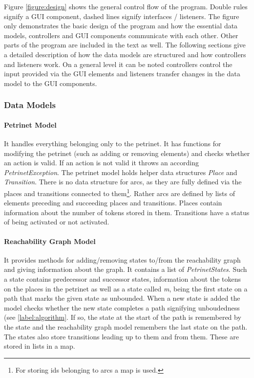\documentclass[10pt, a4paper]{article}
\begin{document}
Figure \ref{figure:design} shows the general control flow of the program. Double rules signify a GUI component, dashed lines signify interfaces / listeners. The figure only demonstrates the basic design of the program and how the essential data models, controllers and GUI components communicate with each other. Other parts of the program are included in the text as well. The following sections give a detailed description of how the data models are structured and how controllers and listeners work. On a general level it can be noted controllers control the input provided via the GUI elements and listeners transfer changes in the data model to the GUI components. 




\subsubsection{Data Models}

\paragraph{Petrinet Model} It handles everything belonging only to the petrinet. It has functions for modifying the petrinet (such as adding or removing elements) and checks whether an action is valid. If an action is not valid it throws an according \textit{PetrinetException}. The petrinet model holds helper data structures \textit{Place} and \textit{Transition}. There is no data structure for arcs, as they are fully defined via the places and transitions connected to them\footnote{For storing ids belonging to arcs a map is used.}. Rather arcs are defined by lists of elements preceding and succeeding places and transitions. Places contain information about the number of tokens stored in them. Transitions have a status of being activated or not activated.   
\paragraph{Reachability Graph Model} It provides methods for adding/removing states to/from the reachability graph and giving information about the graph. It contains a list of \textit{PetrinetStates}. Such a state contains predecessor and successor states, information about the tokens on the places in the petrinet as well as a state called \textit{m}, being the first state on a path that marks the given state as unbounded. When a new state is added the model checks whether the new state completes a path signifying unboudedness (see \ref{label:algorithm}. If so, the state at the start of the path is remembered by the state and the reachability graph model remembers the last state on the path. The states also store transitions leading up to them and from them. These are stored in lists in a map.
\end{document}

